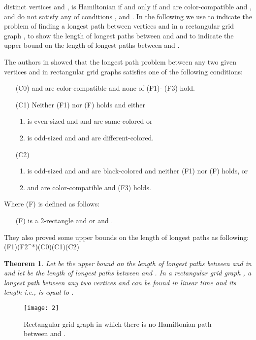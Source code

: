 \documentclass[preprint,12pt]{elsarticle}
\newtheorem{thm}{Theorem}[section]
\begin{document}
distinct vertices  and ,  is Hamiltonian if and
only if  and  are color-compatible and ,  and 
do not satisfy any of conditions ,  and .
In the following we use  to indicate the problem of
finding a longest path between vertices  and  in a rectangular
grid graph ,  to show the length of longest
paths between  and  and  to indicate the upper
bound on the length of longest paths between  and .
\par The authors in
\cite{FAA:ALAFFLPIRGG} showed that the longest path problem between
any two given vertices  and  in rectangular grid graphs satisfies one of the
following conditions:
\begin{itemize}
\item [(C0)]  and  are color-compatible and none of (F1)- (F3) hold.
\item [(C1)] Neither (F1) nor (F) holds and either
\begin{enumerate}
\item  is even-sized and  and  are same-colored or
\item  is odd-sized and  and  are different-colored.
\end{enumerate}
\item [(C2)]
\begin{enumerate}
\item  is odd-sized and  and  are black-colored and neither (F1) nor (F) holds, or
\item  and  are color-compatible and (F3) holds.
\end{enumerate}
\end{itemize}
Where (F) is defined as follows:
\begin{itemize}
\item [(F)]  is a 2-rectangle and  or  and .
\end{itemize}
They also proved some upper bounds on the length of longest paths as
following:\\ (F1)(F2^*)(C0)(C1)(C2)
\begin{thm} \label{theorem:2}\cite{FAA:ALAFFLPIRGG} Let  be the upper bound on the length of
longest paths between  and  in  and let
 be the length of longest paths between  and .
In a rectangular grid graph , a longest path between any two
vertices  and  can be found in linear time and its length
i.e.,  is equal to .
\end{thm}
\begin{figure}[tb]
  \centering
  \texttt{[image: 2]}
  \caption[]{\small Rectangular grid graph in which there is no Hamiltonian path between  and .}
  \label{RecFig}
\end{figure}
\end{document}
